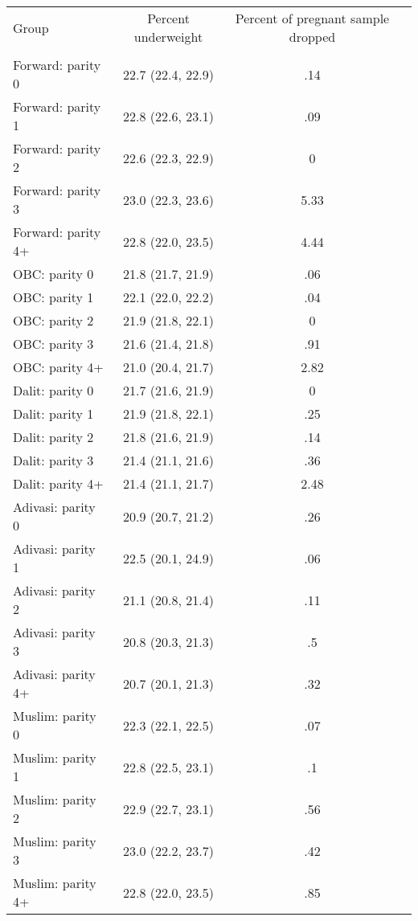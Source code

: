 \begin{tabular}{lccc}
\toprule
Group & Percent underweight & Percent of pregnant sample dropped \\\\
\midrule
Forward: parity 0&22.7 (22.4, 22.9)&.14\\
Forward: parity 1&22.8 (22.6, 23.1)&.09\\
Forward: parity 2&22.6 (22.3, 22.9)&0\\
Forward: parity 3&23.0 (22.3, 23.6)&5.33\\
Forward: parity 4+&22.8 (22.0, 23.5)&4.44\\
OBC: parity 0&21.8 (21.7, 21.9)&.06\\
OBC: parity 1&22.1 (22.0, 22.2)&.04\\
OBC: parity 2&21.9 (21.8, 22.1)&0\\
OBC: parity 3&21.6 (21.4, 21.8)&.91\\
OBC: parity 4+&21.0 (20.4, 21.7)&2.82\\
Dalit: parity 0&21.7 (21.6, 21.9)&0\\
Dalit: parity 1&21.9 (21.8, 22.1)&.25\\
Dalit: parity 2&21.8 (21.6, 21.9)&.14\\
Dalit: parity 3&21.4 (21.1, 21.6)&.36\\
Dalit: parity 4+&21.4 (21.1, 21.7)&2.48\\
Adivasi: parity 0&20.9 (20.7, 21.2)&.26\\
Adivasi: parity 1&22.5 (20.1, 24.9)&.06\\
Adivasi: parity 2&21.1 (20.8, 21.4)&.11\\
Adivasi: parity 3&20.8 (20.3, 21.3)&.5\\
Adivasi: parity 4+&20.7 (20.1, 21.3)&.32\\
Muslim: parity 0&22.3 (22.1, 22.5)&.07\\
Muslim: parity 1&22.8 (22.5, 23.1)&.1\\
Muslim: parity 2&22.9 (22.7, 23.1)&.56\\
Muslim: parity 3&23.0 (22.2, 23.7)&.42\\
Muslim: parity 4+&22.8 (22.0, 23.5)&.85\\
\bottomrule
\end{tabular}
